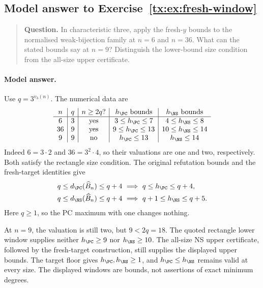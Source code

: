 \begin{samepage}

\subsection*{Model answer to Exercise~\ref{tx:ex:fresh-window}}\label{tx:ans:fresh-window}

\begin{quote}\small\textbf{Question.} In characteristic three, apply the fresh-$y$ bounds to the normalised
weak-bijection family at $n=6$ and $n=36$. What can the stated bounds
say at $n=9$? Distinguish the lower-bound size condition from the
all-size upper certificate.
\end{quote}

\paragraph{Model answer.}
Use \(q=3^{v_3(n)}\). The numerical data are
\[
 \begin{array}{c|c|c|c|c}
 n&q&n\ge2q?&h_{\PC}\text{ bounds}&h_{\NS}\text{ bounds}\\ \hline
 6&3&\text{yes}&3\le h_{\PC}\le7&4\le h_{\NS}\le8\\
 36&9&\text{yes}&9\le h_{\PC}\le13&10\le h_{\NS}\le14\\
 9&9&\text{no}&h_{\PC}\le13&h_{\NS}\le14
 \end{array}
\]
Indeed \(6=3\cdot2\) and \(36=3^2\cdot4\), so their valuations
are one and two, respectively. Both satisfy the rectangle size
condition. The original refutation bounds and the fresh-target
identities give
\[
 \begin{aligned}
 q\le d_{\PC}(\widehat B_n)\le q+4
   &\ \Longrightarrow\ q\le h_{\PC}\le q+4,\\
 q\le d_{\NS}(\widehat B_n)\le q+4
   &\ \Longrightarrow\ q+1\le h_{\NS}\le q+5.
 \end{aligned}
\]
Here \(q\ge1\), so the PC maximum with one changes nothing.
\end{samepage}

At \(n=9\), the valuation is still two, but \(9<2q=18\).
The quoted rectangle lower window supplies neither \(h_{\PC}\ge9\)
nor \(h_{\NS}\ge10\). The all-size NS upper certificate, followed
by the fresh-target construction, still supplies the displayed
upper bounds. The target floor gives \(h_{\PC},h_{\NS}\ge1\),
and \(h_{\PC}\le h_{\NS}\) remains valid at every size.
The displayed windows are bounds, not assertions of exact minimum degrees.


